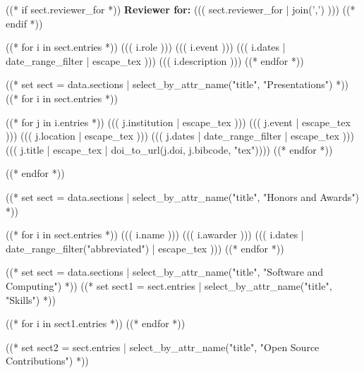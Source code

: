 \documentclass[10pt, letterpaper]{awesome-cv}
\begin{document}
((* if sect.reviewer_for *))
\textbf{Reviewer for:} ((( sect.reviewer_for | join(',') )))
((* endif *))

\begin{cventries}
((* for i in sect.entries *))
\cventry
  {((( i.role )))}
  {((( i.event )))}
  {}
  {((( i.dates | date_range_filter | escape_tex )))}
  {((( i.description )))}
((* endfor *))
\end{cventries}

((* set sect = data.sections | select_by_attr_name("title", "Presentations") *))
((* for i in sect.entries *))
\begin{cventries}
((* for j in i.entries *))
\cventry
  {((( j.institution | escape_tex )))}
  {((( j.event | escape_tex )))}
  {((( j.location | escape_tex )))}
  {((( j.dates | date_range_filter | escape_tex )))}
  {((( j.title | escape_tex | doi_to_url(j.doi, j.bibcode, "tex"))))}
((* endfor *))
\end{cventries}
((* endfor *))

((* set sect = data.sections | select_by_attr_name("title", "Honors and Awards") *))
\begin{cvhonors}
((* for i in sect.entries *))
\cvhonor
  {((( i.name )))}
  {((( i.awarder )))}
  {}
  {((( i.dates | date_range_filter("abbreviated") | escape_tex )))}
((* endfor *))
\end{cvhonors}

((* set sect = data.sections | select_by_attr_name("title", "Software and Computing") *))
((* set sect1 = sect.entries | select_by_attr_name("title", "Skills") *))
\begin{cvskills}
((* for i in sect1.entries *))
((* endfor *))
\end{cvskills}
((* set sect2 = sect.entries | select_by_attr_name("title", "Open Source Contributions") *))
\end{document}
